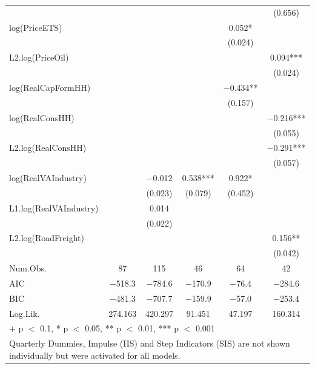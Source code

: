 \begin{table}
{\begin{tabular}[t]{lccccc}
 &  &  &  &  & (\num{0.656})\\
log(PriceETS) &  &  &  & \num{0.052}* & \\
 &  &  &  & (\num{0.024}) & \\
L2.log(PriceOil) &  &  &  &  & \num{0.094}***\\
 &  &  &  &  & (\num{0.024})\\
log(RealCapFormHH) &  &  &  & \num{-0.434}** & \\
 &  &  &  & (\num{0.157}) & \\
log(RealConsHH) &  &  &  &  & \num{-0.216}***\\
 &  &  &  &  & (\num{0.055})\\
L2.log(RealConsHH) &  &  &  &  & \num{-0.291}***\\
 &  &  &  &  & (\num{0.057})\\
log(RealVAIndustry) &  & \num{-0.012} & \num{0.538}*** & \num{0.922}* & \\
 &  & (\num{0.023}) & (\num{0.079}) & (\num{0.452}) & \\
L1.log(RealVAIndustry) &  & \num{0.014} &  &  & \\
 &  & (\num{0.022}) &  &  & \\
L2.log(RoadFreight) &  &  &  &  & \num{0.156}**\\
 &  &  &  &  & (\num{0.042})\\
\midrule
Num.Obs. & \num{87} & \num{115} & \num{46} & \num{64} & \num{42}\\
AIC & \num{-518.3} & \num{-784.6} & \num{-170.9} & \num{-76.4} & \num{-284.6}\\
BIC & \num{-481.3} & \num{-707.7} & \num{-159.9} & \num{-57.0} & \num{-253.4}\\
Log.Lik. & \num{274.163} & \num{420.297} & \num{91.451} & \num{47.197} & \num{160.314}\\
\bottomrule
\multicolumn{6}{l}{\rule{0pt}{1em}+ p $<$ 0.1, * p $<$ 0.05, ** p $<$ 0.01, *** p $<$ 0.001}\\
\multicolumn{6}{l}{\rule{0pt}{1em}Quarterly Dummies, Impulse (IIS) and Step Indicators (SIS) are not shown individually but were activated for all models.}\\
\end{tabular}}
\end{table}

